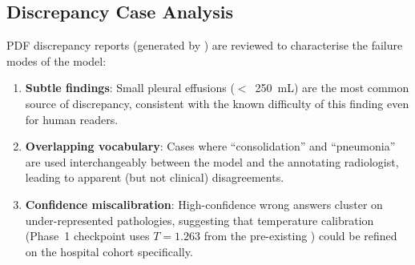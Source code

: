 \subsection{Discrepancy Case Analysis}
\label{subsec:discrepancy}

PDF discrepancy reports (generated by )
are reviewed to characterise the failure modes of the model:

\begin{enumerate}
  \item \textbf{Subtle findings}: Small pleural effusions
        ($<$~250~mL) are the most common source of discrepancy,
        consistent with the known difficulty of this finding even for
        human readers.
  \item \textbf{Overlapping vocabulary}: Cases where ``consolidation''
        and ``pneumonia'' are used interchangeably between the model and
        the annotating radiologist, leading to apparent
        (but not clinical) disagreements.
  \item \textbf{Confidence miscalibration}: High-confidence wrong answers
        cluster on under-represented pathologies, suggesting that
        temperature calibration (Phase~1 checkpoint uses $T=1.263$
        from the pre-existing ) could be refined
        on the hospital cohort specifically.
\end{enumerate}
